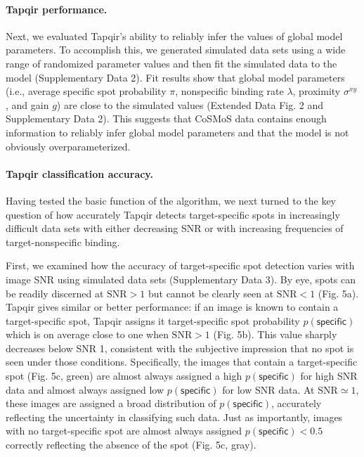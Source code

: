 \paragraph{Tapqir performance.}
Next, we evaluated Tapqir's ability to reliably infer the values of global model parameters. To  accomplish this, we generated simulated data sets  using  a wide range of randomized parameter values and then fit the simulated data to the model (Supplementary Data 2). Fit results show that global model parameters (i.e., average specific spot probability $\pi$, nonspecific binding rate $\lambda$, proximity $\sigma^{xy}$, and gain $g$) are close to the simulated values  (Extended Data Fig. 2 and Supplementary Data 2). This suggests that CoSMoS data contains enough information to reliably infer global model parameters and that the model is not obviously overparameterized.

\paragraph{Tapqir classification accuracy.} Having tested the basic function of the algorithm, we next turned to the key question of how accurately Tapqir detects target-specific spots in increasingly difficult data sets with either decreasing SNR or with increasing frequencies of target-nonspecific binding.  

First, we examined how the accuracy of target-specific spot detection varies with  image SNR using simulated data sets (Supplementary Data 3). By eye, spots can be readily discerned at $\mathrm{SNR}>1$ but cannot be clearly seen at $\mathrm{SNR}<1$ (Fig. 5a). Tapqir gives similar or better performance:  if an image is known to contain a target-specific spot, Tapqir assigns it target-specific spot probability $p(\mathsf{specific})$ which is on average close to  one when $\mathrm{SNR}>1$ (Fig. 5b).  This value sharply decreases below SNR 1, consistent with the subjective impression that no spot is seen under those conditions.  Specifically, the images that contain a target-specific spot (Fig. 5c, green) are almost always assigned a high $p(\mathsf{specific})$ for high SNR data and almost always assigned low $p(\mathsf{specific})$ for low SNR data.  At $\mathrm{SNR} \simeq 1$, these images are assigned a broad distribution of $p(\mathsf{specific})$, accurately reflecting the uncertainty in classifying such data.  Just as importantly, images with no target-specific spot are almost always assigned $p(\mathsf{specific}) < 0.5$ correctly reflecting the absence of the spot (Fig. 5c, gray).

